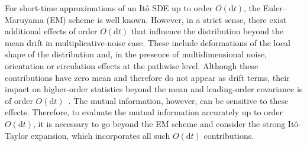 \documentclass[
 longbibliography,
 twocolumn,
 superscriptaddress,
 amsmath,
 amssymb,
 amsthm,
 amsfonts,
 prl,
 floatfix,
]{revtex4-2}
\begin{document}
\begin{widetext}
For short-time approximations of an It\^{o} SDE up to order $O(\mathrm{d}t)$, the Euler–Maruyama (EM) scheme is well known.
However, in a strict sense, there exist additional effects of order $O(\mathrm{d}t)$ that influence the distribution beyond the mean drift in multiplicative-noise case.
These include deformations of the local shape of the distribution and, in the presence of multidimensional noise, 
orientation or circulation effects at the pathwise level.
Although these contributions have zero mean and therefore do not appear as drift terms, 
their impact on higher-order statistics beyond the mean and leading-order covariance is of order $O(\mathrm{d}t)$~\cite{kloeden1992numerical,milstein1975strong}.
The mutual information, however, can be sensitive to these effects.
Therefore, to evaluate the mutual information accurately up to order $O(\mathrm{d}t)$, 
it is necessary to go beyond the EM scheme and consider the strong It\^{o}-Taylor expansion, which incorporates all such 
$O(\mathrm{d}t)$ contributions.


\end{widetext}
\end{document}
